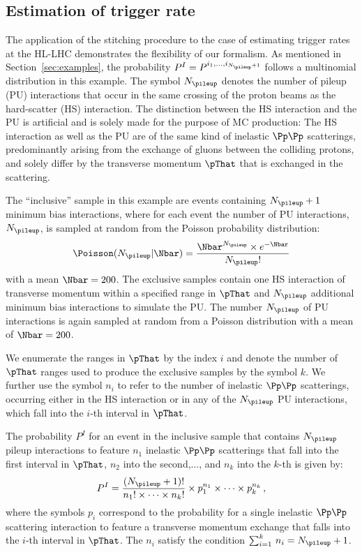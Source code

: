 \subsection{Estimation of trigger rate}
\label{sec:examples_trigger_rate}

The application of the stitching procedure to the case of estimating trigger rates at the HL-LHC demonstrates the flexibility of our formalism.
As mentioned in Section~\ref{sec:examples}, the probability $P^{I} = P^{i_{1},\dots,i_{N_{\pileup}+1}}$ follows a multinomial distribution in this example.
The symbol $N_{\pileup}$ denotes the number of pileup (PU) interactions 
that occur in the same crossing of the proton beams as the hard-scatter (HS) interaction. 
The distinction between the HS interaction and the PU is artificial and is solely made for the purpose of MC production:
The HS interaction as well as the PU are of the same kind of inelastic $\Pp\Pp$ scatterings,
predominantly arising from the exchange of gluons between the colliding protons,
and solely differ by the transverse momentum $\pThat$ that is exchanged in the scattering.

The ``inclusive'' sample in this example are events containing $N_{\pileup} + 1$ minimum bias interactions,
where for each event the number of PU interactions, $N_{\pileup}$, is sampled at random from the Poisson probability distribution:
\begin{equation}
\Poisson(N_{\pileup} \vert \Nbar) = \frac{\Nbar^{N_{\pileup}} \times e^{-\Nbar}}{N_{\pileup}!}
\label{eq:Poisson}
\end{equation}
with a mean $\Nbar = 200$.
The exclusive samples contain one HS interaction of transverse momentum within a specified range in $\pThat$ and $N_{\pileup}$ additional minimum bias interactions to simulate the PU.
The number $N_{\pileup}$ of PU interactions is again sampled at random from a Poisson distribution with a mean of $\Nbar = 200$.

We enumerate the ranges in $\pThat$ by the index $i$ and denote the number of $\pThat$ ranges used to produce the exclusive samples by the symbol $k$.
We further use the symbol $n_{i}$ to refer to the number of inelastic $\Pp\Pp$ scatterings,
occurring either in the HS interaction or in any of the $N_{\pileup}$ PU interactions,
which fall into the $i$-th interval in $\pThat$.

The probability $P^{I}$ for an event in the inclusive sample that contains $N_{\pileup}$ pileup interactions
to feature $n_{1}$ inelastic $\Pp\Pp$ scatterings that fall into the first interval in $\pThat$, $n_{2}$ into the second,$\dots$, and $n_{k}$ into the $k$-th 
is given by:
\begin{equation}
P^{I} = \frac{(N_{\pileup} + 1)!}{n_{1}! \times \dots \times n_{k}!} \times p_{1}^{n_{1}} \times \dots \times p_{k}^{n_{k}} \, ,
\label{eq:P_inclusive}
\end{equation}
where the symbols $p_{i}$ correspond to the probability for a single inelastic $\Pp\Pp$ scattering interaction to feature a transverse momentum exchange that falls into the $i$-th interval in $\pThat$.
The $n_{i}$ satisfy the condition $\sum_{i=1}^{k} \, n_{i} = N_{\pileup} + 1$.

